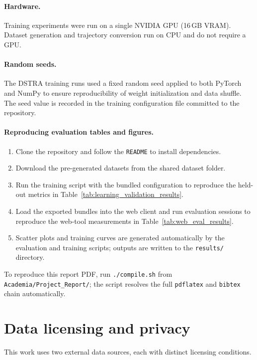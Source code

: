 \paragraph{Hardware.}
Training experiments were run on a single NVIDIA GPU (16\,GB VRAM). Dataset generation and trajectory conversion run on CPU and do not require a GPU.

\paragraph{Random seeds.}
The DSTRA training runs used a fixed random seed applied to both PyTorch and NumPy to ensure reproducibility of weight initialization and data shuffle.
The seed value is recorded in the training configuration file committed to the repository.

\paragraph{Reproducing evaluation tables and figures.}
\begin{enumerate}
    \item Clone the repository and follow the \texttt{README} to install dependencies.
    \item Download the pre-generated datasets from the shared dataset folder.
    \item Run the training script with the bundled configuration to reproduce the held-out metrics in Table~\ref{tab:learning_validation_results}.
    \item Load the exported bundles into the web client and run evaluation sessions to reproduce the web-tool measurements in Table~\ref{tab:web_eval_results}.
    \item Scatter plots and training curves are generated automatically by the evaluation and training scripts; outputs are written to the \texttt{results/} directory.
\end{enumerate}
To reproduce this report PDF, run \texttt{./compile.sh} from \texttt{Academia/Project\_Report/}; the script resolves the full \texttt{pdflatex} and \texttt{bibtex} chain automatically.

\section{Data licensing and privacy}
This work uses two external data sources, each with distinct licensing conditions.

